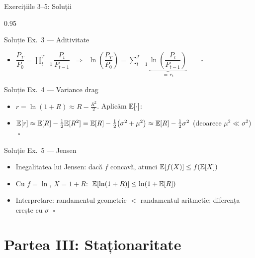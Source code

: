 \documentclass[9pt, aspectratio=169, t]{beamer}
\begin{document}
\begin{frame}[shrink=7]{Exercițiile 3--5: Soluții}
    \begin{cminipage}{0.95\textwidth}
    \begin{exampleblock}{Soluție Ex.\ 3 --- Aditivitate}
    \begin{itemize}\setlength{\itemsep}{0pt}
        \item $\dfrac{P_T}{P_0} = \displaystyle\prod_{t=1}^{T} \dfrac{P_t}{P_{t-1}} \;\;\Rightarrow\;\; \ln\!\left(\dfrac{P_T}{P_0}\right) = \displaystyle\sum_{t=1}^{T} \underbrace{\ln\!\left(\dfrac{P_t}{P_{t-1}}\right)}_{= \, r_t} \qquad \square$
    \end{itemize}
    \end{exampleblock}
    \vspace{0.2cm}
    \begin{exampleblock}{Soluție Ex.\ 4 --- Variance drag}
    \begin{itemize}\setlength{\itemsep}{0pt}
        \item $r = \ln(1+R) \approx R - \tfrac{R^2}{2}$. Aplicăm $\mathbb{E}[\cdot]$:
        \item $\mathbb{E}[r] \approx \mathbb{E}[R] - \tfrac{1}{2}\mathbb{E}[R^2] = \mathbb{E}[R] - \tfrac{1}{2}\bigl(\sigma^2 + \mu^2\bigr) \approx \mathbb{E}[R] - \tfrac{1}{2}\sigma^2$ \quad (deoarece $\mu^2 \ll \sigma^2$) $\;\square$
    \end{itemize}
    \end{exampleblock}
    \vspace{0.2cm}
    \begin{exampleblock}{Soluție Ex.\ 5 --- Jensen}
    \begin{itemize}\setlength{\itemsep}{0pt}
        \item Inegalitatea lui Jensen: dacă $f$ concavă, atunci $\mathbb{E}[f(X)] \leq f(\mathbb{E}[X])$
        \item Cu $f = \ln$, $X = 1+R$: $\;\mathbb{E}[\ln(1+R)] \leq \ln(1+\mathbb{E}[R])$
        \item Interpretare: randamentul geometric $<$ randamentul aritmetic; diferența crește cu $\sigma$ $\;\square$
    \end{itemize}
    \end{exampleblock}
    \end{cminipage}
\end{frame}

\section{Partea III: Staționaritate}
\end{document}
